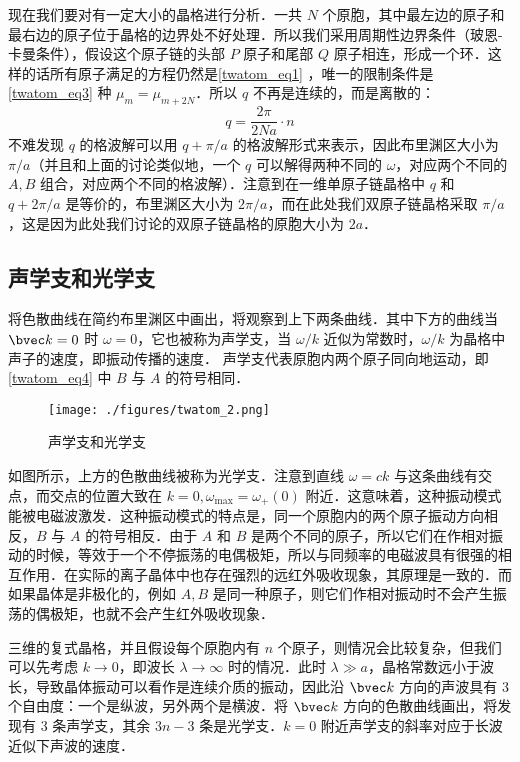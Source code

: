 现在我们要对有一定大小的晶格进行分析．一共 $N$ 个原胞，其中最左边的原子和最右边的原子位于晶格的边界处不好处理．所以我们采用周期性边界条件（玻恩-卡曼条件），假设这个原子链的头部 $P$ 原子和尾部 $Q$ 原子相连，形成一个环．这样的话所有原子满足的方程仍然是\autoref{twatom_eq1} ，唯一的限制条件是 \autoref{twatom_eq3} 种 $\mu_{m}=\mu_{m+2N}$．所以 $q$ 不再是连续的，而是离散的：
\begin{equation}
q=\frac{2\pi}{2Na} \cdot n
\end{equation}
不难发现 $q$ 的格波解可以用 $q+\pi/a$ 的格波解形式来表示，因此布里渊区大小为 $\pi/a$（并且和上面的讨论类似地，一个 $q$ 可以解得两种不同的 $\omega$，对应两个不同的 $A,B$ 组合，对应两个不同的格波解）．注意到在一维单原子链晶格中 $q$ 和 $q+2\pi/a$ 是等价的，布里渊区大小为 $2\pi/a$，而在此处我们双原子链晶格采取 $\pi/a$ ，这是因为此处我们讨论的双原子链晶格的原胞大小为 $2a$．
\subsection{声学支和光学支}
将色散曲线在简约布里渊区中画出，将观察到上下两条曲线．其中下方的曲线当 $\bvec k=0$ 时 $\omega=0$，它也被称为声学支，当 $\omega/k$ 近似为常数时，$\omega/k$ 为晶格中声子的速度，即振动传播的速度． 
声学支代表原胞内两个原子同向地运动，即\autoref{twatom_eq4} 中 $B$ 与 $A$ 的符号相同．
\begin{figure}[ht]
\centering
\texttt{[image: ./figures/twatom\_2.png]}
\caption{声学支和光学支} \label{twatom_fig2}
\end{figure}
如图所示，上方的色散曲线被称为光学支．注意到直线 $\omega=ck$ 与这条曲线有交点，而交点的位置大致在 $k=0,\omega_{\max}=\omega_+(0)$ 附近．这意味着，这种振动模式能被电磁波激发．这种振动模式的特点是，同一个原胞内的两个原子振动方向相反，$B$ 与 $A$ 的符号相反．由于 $A$ 和 $B$ 是两个不同的原子，所以它们在作相对振动的时候，等效于一个不停振荡的电偶极矩，所以与同频率的电磁波具有很强的相互作用．在实际的离子晶体中也存在强烈的远红外吸收现象，其原理是一致的．而如果晶体是非极化的，例如 $A,B$ 是同一种原子，则它们作相对振动时不会产生振荡的偶极矩，也就不会产生红外吸收现象．

三维的复式晶格，并且假设每个原胞内有 $n$ 个原子，则情况会比较复杂，但我们可以先考虑 $k\rightarrow 0$，即波长 $\lambda\rightarrow \infty$ 时的情况．此时 $\lambda\gg a$，晶格常数远小于波长，导致晶体振动可以看作是连续介质的振动，因此沿 $\bvec k$ 方向的声波具有 $3$ 个自由度：一个是纵波，另外两个是横波．将 $\bvec k$ 方向的色散曲线画出，将发现有 $3$ 条声学支，其余 $3n-3$ 条是光学支．$k=0$ 附近声学支的斜率对应于长波近似下声波的速度．
